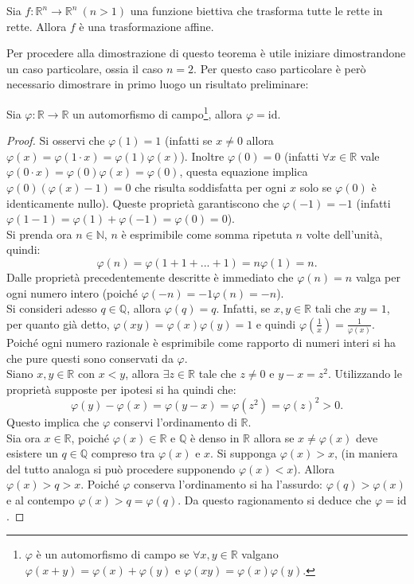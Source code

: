 \begin{thm}
Sia $f:\mathbb{R}^n\rightarrow\mathbb{R}^n\ (n>1)$ una funzione biettiva che trasforma tutte le rette in rette. Allora $f$ è una trasformazione affine. 
\label{thm:LinGenMain}
\end{thm}
Per procedere alla dimostrazione di questo teorema è utile iniziare dimostrandone un caso particolare, ossia il caso $n=2$. Per questo caso particolare è però necessario dimostrare in primo luogo un risultato preliminare:
\begin{prop}
	Sia $\varphi:\mathbb{R}\rightarrow\mathbb{R}$ un automorfismo di campo\footnote{$\varphi$ è un automorfismo di campo se $\forall x,y\in \mathbb{R}$ valgano $\varphi(x+y)=\varphi(x)+\varphi(y)$ e $\varphi(xy)=\varphi(x)\varphi(y)$.}, allora $\varphi=\text{id}$.
\end{prop}	
\begin{proof}
	Si osservi che $\varphi(1)=1$ (infatti se $x\neq0$ allora $\varphi(x)=\varphi(1\cdot x)=\varphi(1)\varphi(x)$). Inoltre $\varphi(0)=0$ (infatti $\forall x\in\mathbb{R}$ vale $\varphi(0\cdot x)=\varphi(0)\varphi(x)=\varphi(0)$, questa equazione implica $\varphi(0)(\varphi(x)-1)=0$ che risulta soddisfatta per ogni $x$ solo se $\varphi(0)$ è identicamente nullo). Queste proprietà garantiscono che $\varphi(-1)=-1$ (infatti $\varphi(1-1)=\varphi(1)+\varphi(-1)=\varphi(0)=0$).\\
	Si prenda ora $n\in\mathbb{N}$, $n$ è esprimibile come somma ripetuta $n$ volte dell'unità, quindi:
	\begin{equation*}
		\varphi(n)=\varphi(1+1+...+1)=n\varphi(1)=n.
	\end{equation*}
	Dalle proprietà precedentemente descritte è immediato che $\varphi(n)=n$ valga per ogni numero intero (poiché $\varphi(-n)=-1\varphi(n)=-n$).\\
	Si consideri adesso $q\in \mathbb{Q}$, allora $\varphi(q)=q$. Infatti, se $x,y\in\mathbb{R}$ tali che $xy=1$, per quanto già detto, $\varphi(xy)=\varphi(x)\varphi(y)=1$ e quindi $\varphi(\frac{1}{x})=\frac{1}{\varphi(x)}$. Poiché ogni numero razionale è esprimibile come rapporto di numeri interi si ha che pure questi sono conservati da $\varphi$.\\
	Siano $x,y\in \mathbb{R}$ con $x<y$, allora $\exists z\in\mathbb{R}$ tale che $z\neq0$ e $y-x=z^2$. Utilizzando le proprietà supposte per ipotesi si ha quindi che:
	\begin{equation*}
		\varphi(y)-\varphi(x)=\varphi(y-x)=\varphi(z^2)=\varphi(z)^2>0.
	\end{equation*}
	Questo implica che $\varphi$ conservi l'ordinamento di $\mathbb{R}$.\\
	Sia ora $x\in\mathbb{R}$, poiché $\varphi(x)\in\mathbb{R}$ e $\mathbb{Q}$ è denso in $\mathbb{R}$ allora se $x\neq\varphi(x)$ deve esistere un $q\in\mathbb{Q}$ compreso tra $\varphi(x)$ e $x$. Si supponga $\varphi(x)>x$, (in maniera del tutto analoga si può procedere supponendo $\varphi(x)<x$). Allora $\varphi(x)> q> x$. Poiché $\varphi$ conserva l'ordinamento si ha l'assurdo: $\varphi(q)>\varphi(x)$ e al contempo $\varphi(x)>q=\varphi(q)$. Da questo ragionamento si deduce che $\varphi=\text{id}$.
\end{proof}
